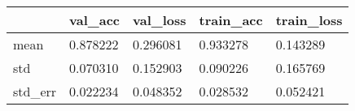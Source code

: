 \begin{tabular}{|l|l|l|l|l|}
\toprule \hline
 & val\_acc & val\_loss & train\_acc & train\_loss \\ \hline
\midrule
mean & 0.878222 & 0.296081 & 0.933278 & 0.143289 \\ \hline
std & 0.070310 & 0.152903 & 0.090226 & 0.165769 \\ \hline
std\_err & 0.022234 & 0.048352 & 0.028532 & 0.052421 \\ \hline
\bottomrule
\end{tabular}

